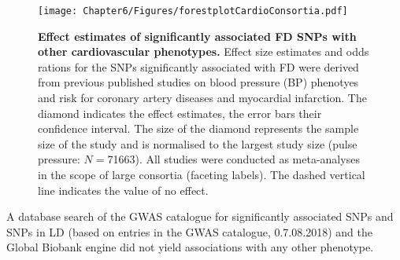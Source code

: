 \begin{figure}[hbtp]
	\centering
	\texttt{[image: Chapter6/Figures/forestplotCardioConsortia.pdf]}
	\caption[\textbf{Effect estimates of significantly associated FD SNPs with other cardiovascular phenotypes. }]{\textbf{Effect estimates of significantly associated FD SNPs with other cardiovascular phenotypes. }Effect size estimates and odds rations for the SNPs significantly associated with FD were derived from previous published studies on blood pressure (BP) phenotyes and risk for coronary artery diseases and myocardial infarction. The diamond indicates the effect estimates, the error bars their confidence interval. The size of the diamond represents the sample size of the study and is normalised to the largest study size (pulse pressure: \(N=\)\num{71663}). All studies were conducted as meta-analyses in the scope of large consortia (faceting labels). The dashed vertical line indicates the value of no effect. }
	 	\label{fig:consortia}
\end{figure}
%
A database search of the GWAS catalogue \citep{MacArthur2017} for significantly associated SNPs and SNPs in LD  (based on entries in the GWAS catalogue, 0.7.08.2018) and the Global Biobank engine \citep{GBE2017} did not yield associations with any other phenotype. 
